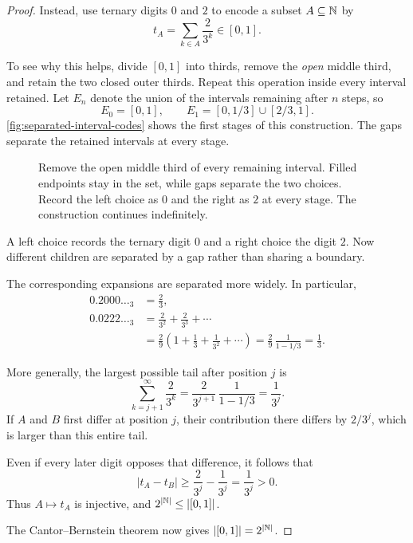 \begin{proof}
  Instead, use ternary digits $0$ and $2$ to encode a subset
  $A\subseteq\mathbb{N}$ by
  \[
    t_A=\sum_{k\in A}\frac{2}{3^k}\in[0,1].
  \]

  To see why this helps, divide $[0,1]$ into thirds, remove the
  \emph{open} middle third, and retain the two closed outer thirds.
  Repeat this operation inside every interval retained. Let $E_n$
  denote the union of the intervals remaining after $n$ steps, so
  \[
    E_0=[0,1],\qquad
    E_1=[0,1/3]\cup[2/3,1].
  \]
  \autoref{fig:separated-interval-codes} shows the first stages of this
  construction. The gaps separate the retained intervals at every stage.


  \begin{figure}[htbp]
    \centering
    
    \caption[Retaining the closed outer thirds.]{Remove
      the open middle third of every remaining interval. Filled endpoints
      stay in the set, while gaps separate the two choices. Record the
      left choice as $0$ and the right as $2$ at every stage. The
      construction continues indefinitely.}
    \label{fig:separated-interval-codes}
  \end{figure}


  A left choice records the ternary digit $0$ and a right choice the
  digit $2$. Now different children are separated by a gap rather than
  sharing a boundary.


  \begin{samepage}
  The corresponding expansions are separated more widely. In particular,
  \begin{align*}
    0.2000\ldots{}_3&=\frac23,\\
    0.0222\ldots{}_3
      &=\frac2{3^2}+\frac2{3^3}+\cdots\\
      &=\frac29\left(1+\frac13+\frac1{3^2}+\cdots\right)
        =\frac29\,\frac1{1-1/3}=\frac13.
  \end{align*}
  \end{samepage}
  More generally, the largest possible tail after position $j$ is
  \[
    \sum_{k=j+1}^{\infty}\frac2{3^k}
      =\frac2{3^{j+1}}\,\frac1{1-1/3}=\frac1{3^j}.
  \]
  If $A$ and $B$ first differ at position $j$, their contribution there
  differs by $2/3^j$, which is larger than this entire tail.

  Even if every later digit opposes that difference, it follows that
  \[
    |t_A-t_B|\ge\frac2{3^j}-\frac1{3^j}
      =\frac1{3^j}>0.
  \]
  Thus $A\mapsto t_A$ is injective, and $2^{|\mathbb{N}|}\le|[0,1]|$.

  The Cantor--Bernstein theorem now gives
  $|[0,1]|=2^{|\mathbb{N}|}$.
\end{proof}


